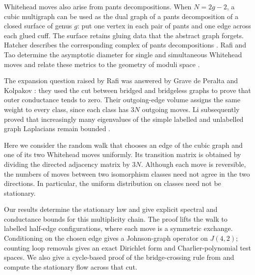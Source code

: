 \documentclass[11pt]{article}
\theoremstyle{plain}
\theoremstyle{definition}
\numberwithin{equation}{section}
\begin{document}
Whitehead moves also arise from pants decompositions.  When $N=2g-2$, a cubic
multigraph can be used as the dual graph of a pants decomposition of a closed
surface of genus $g$: put one vertex in each pair of pants and one edge across
each glued cuff.  The surface retains gluing data that the abstract graph
forgets.  Hatcher describes the corresponding complex of pants decompositions
\cite{Hatcher1999}. Rafi and Tao determine the asymptotic diameter for
single and simultaneous Whitehead moves and relate these metrics to the
geometry of moduli space \cite{RafiTao2013}.

The expansion question raised by Rafi was answered by Grave de Peralta
and Kolpakov \cite{GraveDePeraltaKolpakov2024}: they used the cut between
bridged and bridgeless graphs to prove that outer conductance tends to
zero. Their outgoing-edge volume assigns the same weight to every class,
since each class has $3N$ outgoing moves. Li subsequently proved that
increasingly many eigenvalues of the simple labelled and unlabelled
graph Laplacians remain bounded \cite{Li2024}.

Here we consider the random walk that chooses an edge of the cubic graph and
one of its two Whitehead moves uniformly.  Its transition matrix is obtained
by dividing the directed adjacency matrix by $3N$.  Although each move is
reversible, the numbers of moves between two isomorphism classes need not
agree in the two directions.  In particular, the uniform distribution on
classes need not be stationary.

Our results determine the stationary law and give explicit spectral and
conductance bounds for this multiplicity chain. The proof lifts the walk
to labelled half-edge configurations, where each move is a symmetric
exchange. Conditioning on the chosen edge gives a Johnson-graph operator
on $J(4,2)$; counting loop removals gives an exact Dirichlet form and
Charlier-polynomial test spaces. We also give a cycle-based proof of the
bridge-crossing rule from \cite{GraveDePeraltaKolpakov2024} and compute
the stationary flow across that cut.
\end{document}
